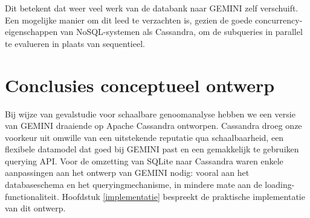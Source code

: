 Dit betekent dat weer veel werk van de databank naar GEMINI zelf verschuift. Een mogelijke manier om dit leed te verzachten is, gezien de goede concurrency-eigenschappen van NoSQL-systemen als Cassandra, om de subqueries in parallel te evalueren in plaats van sequentieel.

\section*{Conclusies conceptueel ontwerp}

Bij wijze van gevalstudie voor schaalbare genoomanalyse hebben we een versie van GEMINI draaiende op Apache Cassandra ontworpen. Cassandra droeg onze voorkeur uit omwille van een uitstekende reputatie qua schaalbaarheid, een flexibele datamodel dat goed bij GEMINI past en een gemakkelijk te gebruiken querying API. Voor de omzetting van SQLite naar Cassandra waren enkele aanpassingen aan het ontwerp van GEMINI nodig: vooral aan het databaseschema en het queryingmechanisme, in mindere mate aan de loading-functionaliteit. Hoofdstuk \ref{implementatie} bespreekt de praktische implementatie van dit ontwerp.